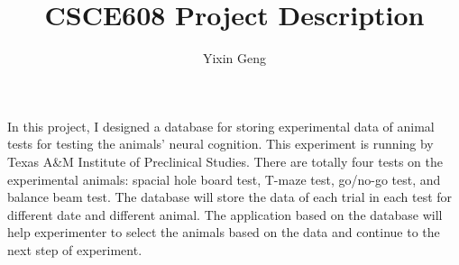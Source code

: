 \documentclass[12pt]{article}
\title{CSCE608 Project Description}
\author{Yixin Geng}
\date{}
\begin{document}
	\maketitle
	In this project, I designed a database for storing experimental data of animal tests for testing the animals' neural cognition. This experiment is running by Texas A\&M Institute of Preclinical Studies. There are totally four tests on the experimental animals: spacial hole board test, T-maze test, go/no-go test, and balance beam test. The database will store the data of each trial in each test for different date and different animal. The application based on the database will help experimenter to select the animals based on the data and continue to the next step of experiment.  	
		
		
	
\end{document}
